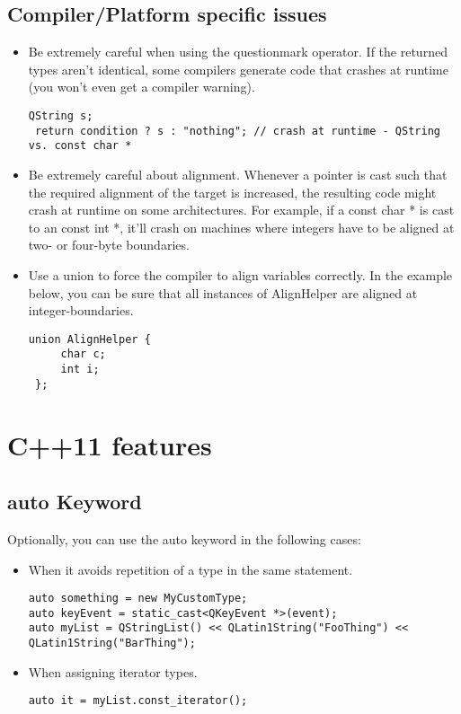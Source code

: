 \documentclass[a4paper,12pt]{article}
\begin{document}
\subsection{Compiler/Platform specific issues}
\begin{itemize}
\item Be extremely careful when using the questionmark operator. If the returned types aren't identical, some compilers generate code that crashes at runtime (you won't even get a compiler warning).
\begin{lstlisting}[breaklines]
 QString s;
 return condition ? s : "nothing"; // crash at runtime - QString vs. const char *
 \end{lstlisting}
\item Be extremely careful about alignment. Whenever a pointer is cast such that the required alignment of the target is increased, the resulting code might crash at runtime on some architectures. For example, if a const char * is cast to an const int *, it'll crash on machines where integers have to be aligned at two- or four-byte boundaries.
\item Use a union to force the compiler to align variables correctly. In the example below, you can be sure that all instances of AlignHelper are aligned at integer-boundaries.
\begin{lstlisting}[breaklines]
union AlignHelper {
     char c;
     int i;
 };
 \end{lstlisting}
\end{itemize}

\clearpage
\newpage

\section{C++11 features}\label{sec:cpp11_features}

\subsection{auto Keyword}
Optionally, you can use the auto keyword in the following cases: 
\begin{itemize}
\item When it avoids repetition of a type in the same statement.
\begin{lstlisting}[breaklines]
auto something = new MyCustomType;
auto keyEvent = static_cast<QKeyEvent *>(event);
auto myList = QStringList() << QLatin1String("FooThing") << QLatin1String("BarThing");
 \end{lstlisting}
\item When assigning iterator types.
\begin{lstlisting}[breaklines]
auto it = myList.const_iterator();
 \end{lstlisting}
\end{itemize}
\end{document}
